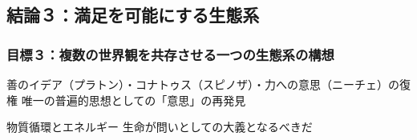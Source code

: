 \subsection{結論３：満足を可能にする生態系}\label{ux7d50ux8ad6uxff13ux6e80ux8db3ux3092ux53efux80fdux306bux3059ux308bux751fux614bux7cfb}

\subsubsection{目標３：複数の世界観を共存させる一つの生態系の構想}\label{ux76eeux6a19uxff13ux8907ux6570ux306eux4e16ux754cux89b3ux3092ux5171ux5b58ux3055ux305bux308bux4e00ux3064ux306eux751fux614bux7cfbux306eux69cbux60f3}

善のイデア（プラトン）・コナトゥス（スピノザ）・力への意思（ニーチェ）の復権
唯一の普遍的思想としての「意思」の再発見

物質循環とエネルギー 生命が問いとしての大義となるべきだ
